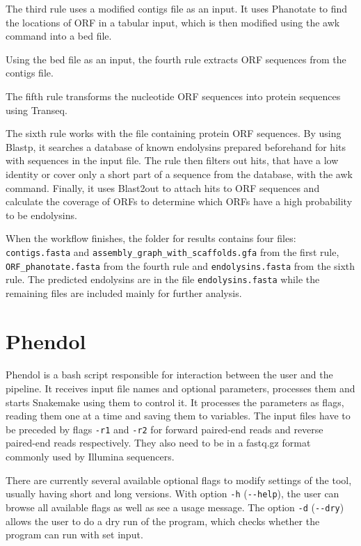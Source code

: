 The third rule uses a modified contigs file as an input. It uses Phanotate to find the locations of ORF in a tabular input, which is then modified using the awk command into a bed file. 

Using the bed file as an input, the fourth rule extracts ORF sequences from the contigs file. 

The fifth rule transforms the nucleotide ORF sequences into protein sequences using Transeq.

The sixth rule works with the file containing protein ORF sequences. By using Blastp, it searches a database of known endolysins prepared beforehand for hits with sequences in the input file. The rule then filters out hits, that have a low identity or cover only a short part of a sequence from the database, with the awk command. Finally, it uses Blast2out to attach hits to ORF sequences and calculate the coverage of ORFs to determine which ORFs have a high probability to be endolysins.

When the workflow finishes, the folder for results contains four files: \texttt{contigs.fasta} and \texttt{assembly\_graph\_with\_scaffolds.gfa} from the first rule, \texttt{ORF\_phanotate.fasta} from the fourth rule and \texttt{endolysins.fasta} from the sixth rule. The predicted endolysins are in the file \texttt{endolysins.fasta} while the remaining files are included mainly for further analysis.

\section{Phendol}
\paragraph*{}
Phendol is a bash script responsible for interaction between the user and the pipeline. It receives input file names and optional parameters, processes them and starts Snakemake using them to control it. It processes the parameters as flags, reading them one at a time and saving them to variables. The input files have to be preceded by flags \texttt{-r1} and \texttt{-r2} for forward paired-end reads and reverse paired-end reads respectively. They also need to be in a fastq.gz format commonly used by Illumina sequencers.

There are currently several available optional flags to modify settings of the tool, usually having short and long versions. With option \texttt{-h} (\texttt{-{}-help}), the user can browse all available flags as well as see a usage message. The option \texttt{-d} (\texttt{-{}-dry}) allows the user to do a dry run of the program, which checks whether the program can run with set input.

